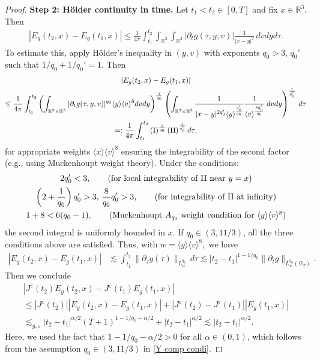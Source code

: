 \documentclass[reqno,11pt,final]{amsart}
\theoremstyle{plain}
\numberwithin{equation}{section}
\numberwithin{theorem}{section}
\begin{document}
\begin{proof}
\textbf{Step 2: H\"older continuity in time.}
Let $t_1<t_2\in[0,T]$ and fix $x\in\mathbb{R}^3$. Then
\begin{align*}
|E_g(t_2,x) - E_g(t_1,x)| \le \frac{1}{4\pi} \int_{t_1}^{t_2}\int_{\mathbb{R}^3} \int_{\mathbb{R}^3} |\partial_tg(\tau, y,v)|\frac{ 1}{|x-y|^2}\,dvdyd\tau.
\end{align*}To estimate this, apply H\"older's inequality in $(y,v)$ with exponents $q_0>3$, $q_0'$ such that $1/q_0 + 1/q_0'=1$. Then
\begin{multline*}
|E_g(t_2,x) - E_g(t_1,x)|\\ \le \frac{1}{4\pi}\int_{t_1}^{t_2} \left(\int_{\mathbb{R}^3\times\mathbb{R}^3} |\partial_tg(\tau,y,v)|^{q_0} \langle y\rangle \langle v\rangle^8 dvdy\right)^{\frac{1}{q_0}} 
\left(\int_{\mathbb{R}^3\times\mathbb{R}^3} \frac{1}{|x-y|^{2q_0'}\langle y\rangle^{\frac{q_0'}{q_0}}} \frac{1}{\langle v\rangle^{\frac{8q_0'}{q_0}}}\,dvdy\right)^{\frac{1}{q_0'}}\,d\tau\\
=: \frac{1}{4\pi}\int_{t_1}^{t_2} \left(\textup{I}\right)^{\frac{1}{q_0}} \left(\textup{II}\right)^{\frac{1}{q'_0}} d\tau,
\end{multline*}for appropriate weights $\langle x\rangle\langle v\rangle^8$ ensuring the integrability of the second factor (e.g., using Muckenhoupt weight theory). Under the conditions:
\begin{gather}
2q_0'<3,\tag{for local integrability of $\textup{II}$ near $y=x$}\\
\left(2+ \frac{1}{q_0} \right)q'_0 > 3, \,\frac{8}{q_0}q'_0 >3, \tag{for integrability of $\textup{II}$ at infinity}\\
1+8<6(q_0-1), \tag{Muckenhoupt $A_{q_0}$ weight condition for $\langle y\rangle \langle v\rangle^8 $}
\end{gather}the second integral is uniformly bounded in $x$. If $q_0\in (3,11/3)$, all the three conditions above are satisfied. Thus, with $w=\langle y\rangle \langle v\rangle^8 ,$ we have
\begin{align*}
|E_g(t_2,x) - E_g(t_1,x)| &\lesssim \int_{t_1}^{t_2} \lVert \partial_\tau g(\tau)\rVert_{L^{q_0}_w}\,d\tau \lesssim |t_2-t_1|^{1-1/q_0} \lVert \partial_tg\rVert_{L^{q_0}_w(\mathcal{Q}_T)}.
\end{align*}Then we conclude
\begin{multline*}
|J^\varepsilon(t_2)E_g(t_2,x) - J^\varepsilon(t_1)E_g(t_1,x)| \\
\le |J^\varepsilon(t_2)| |E_g(t_2,x) - E_g(t_1,x)| + |J^\varepsilon(t_2) - J^\varepsilon(t_1)| |E_g(t_1,x)|\\
\lesssim_{g,\varepsilon} |t_2 - t_1|^{\alpha/2} (T+1)^{1-1/q_0-\alpha/2} + |t_2 - t_1|^{\alpha/2} \lesssim |t_2-t_1|^{\alpha/2}.
\end{multline*}Here, we used the fact that $1-1/q_0-\alpha/2>0$ for all $\alpha\in(0,1)$, which follows from the assumption $q_0\in(3,11/3)$ in \eqref{Y comp condi}.


\end{proof}
\end{document}
